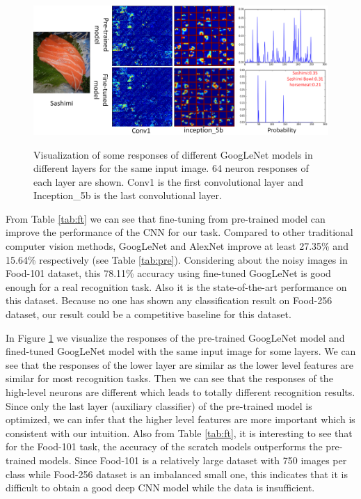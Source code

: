 \begin{figure}[htbp]
  \centering
  \includegraphics[scale=0.5]{fig/sashimi.png}\\
  \caption{Visualization of some responses of different GoogLeNet models in different layers for the same input image. 64 neuron responses of each layer are shown. Conv1 is the first convolutional layer and Inception\_5b is the last convolutional layer. }
   \label{fig:sashimi}
\end{figure}
From Table \ref{tab:ft} we can see that fine-tuning from pre-trained model can improve the performance of the CNN for our task. Compared to other traditional computer vision methods, GoogLeNet and AlexNet improve at least 27.35\% and 15.64\% respectively (see Table \ref{tab:pre}). Considering about the noisy images in Food-101 dataset, this 78.11\% accuracy using fine-tuned GoogLeNet is good enough for a real recognition task. Also it is the state-of-the-art performance on this dataset. Because no one has shown any classification result on Food-256 dataset, our result could be a competitive baseline for this dataset.

In Figure \ref{fig:sashimi} we visualize the responses of the pre-trained GoogLeNet model and fined-tuned GoogLeNet model with the same input image for some layers. We can see that the responses of the lower layer are similar as the lower level features are similar for most recognition tasks.
Then we can see that the responses of the high-level neurons are different which leads to totally different recognition results.
Since only the last layer (auxiliary classifier) of the pre-trained model is optimized, we can infer that the higher level features are more important which is consistent with our intuition. Also from Table \ref{tab:ft}, it is interesting to see that for the Food-101 task, the accuracy of  the scratch models outperforms the pre-trained models. Since Food-101 is a relatively large dataset with 750 images per class while Food-256 dataset is an imbalanced small one, this indicates that it is difficult to obtain a good deep CNN model while the data is insufficient.

